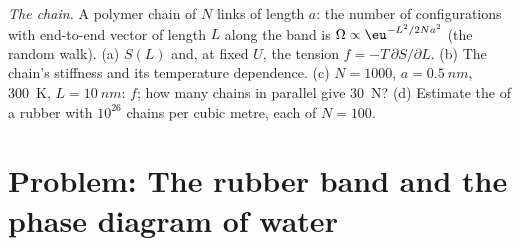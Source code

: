 \begin{exercise}[$\star\star\star$]\label{exo:b2:thermodynamic-potentials:12}
\emph{The chain.} A polymer chain of $N$ links of length $a$: the
number of configurations with end-to-end vector of length $L$ along
the band is $\Omega \propto \eu^{-L^2/2Na^2}$ (the random walk). (a) $S(L)$
and, at fixed $U$, the tension $f = -T\,\partial S/\partial L$. (b) The
chain's stiffness and its temperature dependence. (c) $N = 1000$, $a =
\qty{0.5}{nm}$, \qty{300}{K}, $L = \qty{10}{nm}$: $f$; how many chains in
parallel give \qty{30}{N}? (d) Estimate the  of a rubber
with $10^{26}$ chains per cubic metre, each of $N = 100$.
\end{exercise}

\section{Problem: The rubber band and the phase diagram of water}

